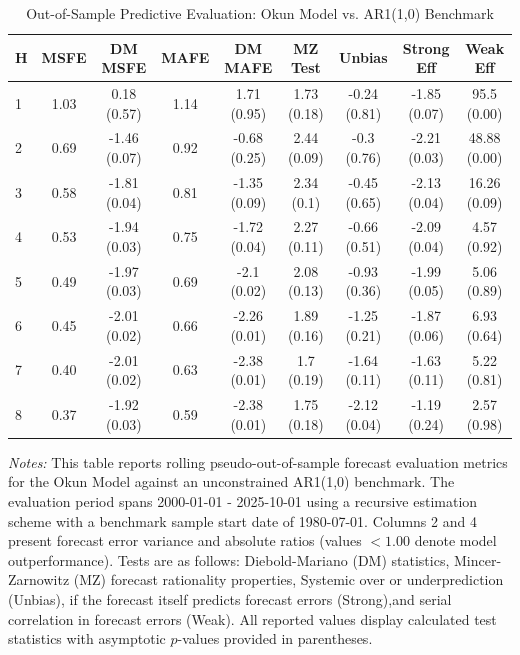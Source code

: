 \begin{table}[htbp]
\centering
\caption{Out-of-Sample Predictive Evaluation: Okun Model vs. AR1(1,0) Benchmark}
\label{tab:okun_model_evaluation}
\footnotesize
\begin{tabular}{l cccccccc}
\hline\hline
\rule{0pt}{3ex}
\textbf{H} & \textbf{MSFE} & \textbf{DM MSFE} & \textbf{MAFE} & \textbf{DM MAFE} & \textbf{MZ Test} & \textbf{Unbias} & \textbf{Strong Eff} & \textbf{Weak Eff} \\[0.5ex]
\hline
\rule{0pt}{2.5ex}
1 & 1.03 & 0.18 (0.57) & 1.14 & 1.71 (0.95) & 1.73 (0.18) & -0.24 (0.81) & -1.85 (0.07) & 95.5 (0.00) \\
2 & 0.69 & -1.46 (0.07) & 0.92 & -0.68 (0.25) & 2.44 (0.09) & -0.3 (0.76) & -2.21 (0.03) & 48.88 (0.00) \\
3 & 0.58 & -1.81 (0.04) & 0.81 & -1.35 (0.09) & 2.34 (0.1) & -0.45 (0.65) & -2.13 (0.04) & 16.26 (0.09) \\
4 & 0.53 & -1.94 (0.03) & 0.75 & -1.72 (0.04) & 2.27 (0.11) & -0.66 (0.51) & -2.09 (0.04) & 4.57 (0.92) \\
5 & 0.49 & -1.97 (0.03) & 0.69 & -2.1 (0.02) & 2.08 (0.13) & -0.93 (0.36) & -1.99 (0.05) & 5.06 (0.89) \\
6 & 0.45 & -2.01 (0.02) & 0.66 & -2.26 (0.01) & 1.89 (0.16) & -1.25 (0.21) & -1.87 (0.06) & 6.93 (0.64) \\
7 & 0.40 & -2.01 (0.02) & 0.63 & -2.38 (0.01) & 1.7 (0.19) & -1.64 (0.11) & -1.63 (0.11) & 5.22 (0.81) \\
8 & 0.37 & -1.92 (0.03) & 0.59 & -2.38 (0.01) & 1.75 (0.18) & -2.12 (0.04) & -1.19 (0.24) & 2.57 (0.98) \\
\hline\hline
\end{tabular}%
\par\smallskip
\parbox{\textwidth}{\scriptsize \textit{Notes:} This table reports rolling pseudo-out-of-sample forecast evaluation metrics for the Okun Model against an unconstrained AR1(1,0) benchmark. The evaluation period spans 2000-01-01 - 2025-10-01 using a recursive estimation scheme with a benchmark sample start date of 1980-07-01. Columns 2 and 4 present forecast error variance and absolute ratios (values $< 1.00$ denote model outperformance). Tests are as follows: Diebold-Mariano (DM) statistics, Mincer-Zarnowitz (MZ) forecast rationality properties, Systemic over or underprediction (Unbias), if the forecast itself predicts forecast errors (Strong),and serial correlation in forecast errors (Weak). All reported values display calculated test statistics with asymptotic $p$-values provided in parentheses.}
\end{table}
